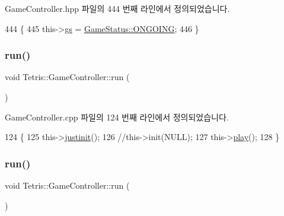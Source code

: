 Game\+Controller.\+hpp 파일의 444 번째 라인에서 정의되었습니다.


\begin{DoxyCode}
444                          \{
445                 this->\hyperlink{class_tetris_1_1_game_controller_ae4c894005a82404c73a5a9a6efb208dc}{gs} = \hyperlink{class_tetris_1_1_game_controller_a96a963b56385f3b3a122ff0ca2beb770acff9d04a8a29792d319be9177afb8ba3}{GameStatus::ONGOING};
446             \}
\end{DoxyCode}
\mbox{\label{class_tetris_1_1_game_controller_a49446695e3ba0ff829f20beaeecac6da}} 
\subsubsection{\texorpdfstring{run()}{run()}\hspace{0.1cm}{\footnotesize\ttfamily [1/2]}}
{\footnotesize\ttfamily void Tetris\+::\+Game\+Controller\+::run (\begin{DoxyParamCaption}{ }\end{DoxyParamCaption})}



Game\+Controller.\+cpp 파일의 124 번째 라인에서 정의되었습니다.


\begin{DoxyCode}
124                             \{
125                 this->\hyperlink{class_tetris_1_1_game_controller_aef406397d4719c9edd49774d0343ce05}{justinit}();
126                 \textcolor{comment}{//this->init(NULL);}
127                 this->\hyperlink{class_tetris_1_1_game_controller_a766a7537d955c62969f2e4b7c0b3c73d}{play}();
128             \}
\end{DoxyCode}
\mbox{\label{class_tetris_1_1_game_controller_a49446695e3ba0ff829f20beaeecac6da}} 
\subsubsection{\texorpdfstring{run()}{run()}\hspace{0.1cm}{\footnotesize\ttfamily [2/2]}}
{\footnotesize\ttfamily void Tetris\+::\+Game\+Controller\+::run (\begin{DoxyParamCaption}{ }\end{DoxyParamCaption})\hspace{0.3cm}{\ttfamily [inline]}}



